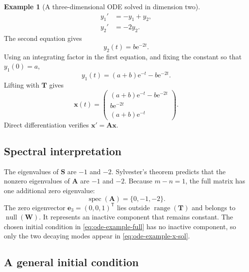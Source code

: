 \documentclass[11pt]{article}
\newcommand{\mat}[1]{\mathbf{#1}}
\newcommand{\vect}[1]{\mathbf{#1}}
\newcommand{\range}{\operatorname{range}}
\newcommand{\spec}{\operatorname{spec}}
\newcommand{\nullsp}{\operatorname{null}}
\newcommand{\e}{\mathrm{e}}
\theoremstyle{definition}
\newtheorem{example}[example]{Example}
\theoremstyle{remark}
\begin{document}
\begin{example}[A three-dimensional ODE solved in dimension two]
\begin{align}
  y_1'&=-y_1+y_2,
  \label{eq:ode-example-y1}\\
  y_2'&=-2y_2.
  \label{eq:ode-example-y2}
\end{align}
The second equation gives
\begin{equation}
  y_2(t)=b\e^{-2t}.
  \label{eq:ode-example-y2-sol}
\end{equation}
Using an integrating factor in the first equation, and fixing the constant so that \(y_1(0)=a\),
\begin{equation}
  y_1(t)=(a+b)\e^{-t}-b\e^{-2t}.
  \label{eq:ode-example-y1-sol}
\end{equation}
Lifting with \(\mat{T}\) gives
\begin{equation}
  \vect{x}(t)
  =
  \begin{pmatrix}
    (a+b)\e^{-t}-b\e^{-2t}\\
    b\e^{-2t}\\
    (a+b)\e^{-t}
  \end{pmatrix}.
  \label{eq:ode-example-x-sol}
\end{equation}
Direct differentiation verifies \(\vect{x}'=\mat{A}\vect{x}\).
\end{example}

\subsection{Spectral interpretation}

The eigenvalues of \(\mat{S}\) are \(-1\) and \(-2\). Sylvester's theorem predicts that the nonzero eigenvalues of \(\mat{A}\) are \(-1\) and \(-2\). Because \(m-n=1\), the full matrix has one additional zero eigenvalue:
\begin{equation}
  \spec(\mat{A})=\{0,-1,-2\}.
  \label{eq:ode-example-spectrum}
\end{equation}
The zero eigenvector \(\vect{e}_3=(0,0,1)^{\mathsf T}\) lies outside \(\range(\mat{T})\) and belongs to \(\nullsp(\mat{W})\). It represents an inactive component that remains constant. The chosen initial condition in \cref{eq:ode-example-full} has no inactive component, so only the two decaying modes appear in \cref{eq:ode-example-x-sol}.

\subsection{A general initial condition}
\end{document}
